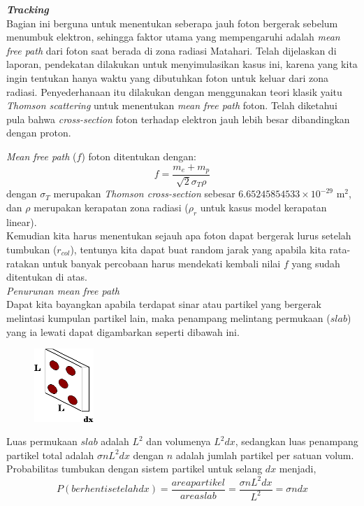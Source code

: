 \documentclass[paper=a4, fontsize=11pt]{scrartcl}
\numberwithin{equation}{section} %
\numberwithin{figure}{section} %
\numberwithin{table}{section} %
\begin{document}
\vspace{1.5cm}
\textbf{\textit{Tracking}}\\
Bagian ini berguna untuk menentukan seberapa jauh foton bergerak sebelum menumbuk elektron, sehingga faktor utama yang mempengaruhi adalah \textit{mean free path} dari foton saat berada di zona radiasi Matahari. Telah dijelaskan di laporan, pendekatan dilakukan untuk menyimulasikan kasus ini, karena yang kita ingin tentukan hanya waktu yang dibutuhkan foton untuk keluar dari zona radiasi. Penyederhanaan itu dilakukan dengan menggunakan teori klasik yaitu \textit{Thomson scattering} untuk menentukan \textit{mean free path} foton. Telah diketahui pula bahwa \textit{cross-section} foton terhadap elektron jauh lebih besar dibandingkan dengan proton.

\textit{Mean free path} ($f$) foton ditentukan dengan:
\begin{equation*}
f = \frac{m_e + m_p}{\sqrt{2} \sigma_T \rho}
\end{equation*}
dengan $\sigma_T$ merupakan \textit{Thomson cross-section} sebesar $6.65245854533 \times 10^{-29}$ m$^2$, dan $\rho$ merupakan kerapatan zona radiasi ($\rho_r$ untuk kasus model kerapatan linear).\\

Kemudian kita harus menentukan sejauh apa foton dapat bergerak lurus setelah tumbukan ($r_{col}$), tentunya kita dapat buat random jarak yang apabila kita rata-ratakan untuk banyak percobaan harus mendekati kembali nilai $f$ yang sudah ditentukan di atas.\\

\textit{Penurunan mean free path}\\
Dapat kita bayangkan apabila terdapat sinar atau partikel yang bergerak melintasi kumpulan partikel lain, maka penampang melintang permukaan ($slab$) yang ia lewati dapat digambarkan seperti dibawah ini.
\begin{figure}
	\centering
	\includegraphics[width=0.2\textwidth]{mfp.png}
\end{figure}
Luas permukaan $slab$ adalah $L^2$ dan volumenya $L^2 dx$, sedangkan luas penampang partikel total adalah $\sigma n L^2 dx$ dengan $n$ adalah jumlah partikel per satuan volum. Probabilitas tumbukan dengan sistem partikel untuk selang $dx$ menjadi,
\begin{equation*}
P(berhenti setelah dx) = \frac{area partikel}{area slab} = \frac{\sigma n L^2 dx}{L^2} = \sigma n dx
\end{equation*}
\end{document}
